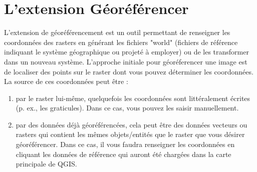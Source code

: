 \section{L'extension Géoréférencer}


L'extension de géoréférencement est un outil permettant de renseigner les coordonnées des rasters en générant les fichiers "world" (fichiers de référence indiquant le système géographique ou projeté à employer) ou de les transformer dans un nouveau système. L'approche initiale pour géoréferencer une image est de localiser des points sur le raster dont vous pouvez déterminer les coordonnées. La source de ces coordonnées peut être :


\begin{enumerate}
\item par le raster lui-même, quelquefois les coordonnées sont littéralement écrites (p. ex., les graticules). Dans ce cas, vous pouvez les saisir manuellement.
\item par des données déjà géoréférencées, cela peut être des données vecteurs ou rasters qui contient les mêmes objets/entités que le raster que vous désirer géoréférencer. Dans ce cas, il vous faudra renseigner les coordonnées en cliquant les données de référence qui auront été chargées dans la carte principale de QGIS.
\end{enumerate}


